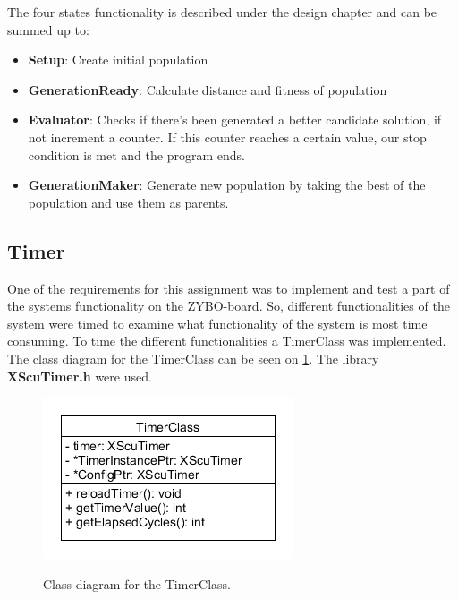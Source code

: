 The four states functionality is described under the design chapter and can be summed up to:

\begin{itemize}
	\item \textbf{Setup}: Create initial population
	\item \textbf{GenerationReady}: Calculate distance and fitness of population
	\item \textbf{Evaluator}: Checks if there's been generated a better candidate solution, if not increment a counter. If this counter reaches a certain value, our stop condition is met and the program ends.
	\item \textbf{GenerationMaker}: Generate new population by taking the best of the population and use them as parents.
\end{itemize}


\subsection{Timer}
One of the requirements for this assignment was to implement and test a part of the systems functionality on the ZYBO-board. So, different functionalities of the system were timed to examine what functionality of the system is most time consuming. To time the different functionalities a TimerClass was implemented. The class diagram for the TimerClass can be seen on \cref{fig:TimerClass_CD}. The library \textbf{XScuTimer.h} were used. 
\begin{figure}[H]
	\centering
	{\includegraphics[width=\textwidth/2]{Images/TimerClass_CD.PNG}}\\[0.5cm]
	\caption{Class diagram for the TimerClass.}
	\label{fig:TimerClass_CD}
\end{figure}

